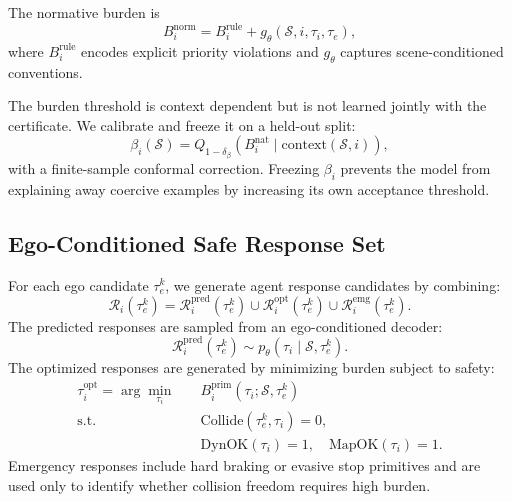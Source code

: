 \documentclass[10pt]{article}
\begin{document}
The normative burden is
\begin{equation}
    B^{\mathrm{norm}}_i
    =
    B^{\mathrm{rule}}_i
    +
    g_\theta(\mathcal{S},i,\tau_i,\tau_e),
\end{equation}
where $B^{\mathrm{rule}}_i$ encodes explicit priority violations and $g_\theta$ captures scene-conditioned conventions.

The burden threshold is context dependent but is not learned jointly with the certificate. We calibrate and freeze it on a held-out split:
\begin{equation}
    \beta_i(\mathcal{S})
    =Q_{1-\delta_\beta}
    \left(B_i^{\mathrm{nat}}\mid \mathrm{context}(\mathcal{S},i)\right),
\end{equation}
with a finite-sample conformal correction. Freezing $\beta_i$ prevents the model from explaining away coercive examples by increasing its own acceptance threshold.

\subsection{Ego-Conditioned Safe Response Set}
\label{app:safe_response}

For each ego candidate $\tau^k_e$, we generate agent response candidates by combining:
\begin{equation}
    \mathcal{R}_i(\tau^k_e)
    =
    \mathcal{R}^{\mathrm{pred}}_i(\tau^k_e)
    \cup
    \mathcal{R}^{\mathrm{opt}}_i(\tau^k_e)
    \cup
    \mathcal{R}^{\mathrm{emg}}_i(\tau^k_e).
\end{equation}
The predicted responses are sampled from an ego-conditioned decoder:
\begin{equation}
    \mathcal{R}^{\mathrm{pred}}_i(\tau^k_e)
    \sim
    p_\theta(\tau_i \mid \mathcal{S},\tau^k_e).
\end{equation}
The optimized responses are generated by minimizing burden subject to safety:
\begin{equation}
\begin{aligned}
    \tau_i^{\mathrm{opt}}
    =
    \arg\min_{\tau_i}\quad
    &
    B_i^{\mathrm{prim}}(\tau_i;\mathcal{S},\tau^k_e) \\
    \mathrm{s.t.}\quad
    &
    \mathrm{Collide}(\tau^k_e,\tau_i)=0,\\
    &
    \mathrm{DynOK}(\tau_i)=1,\quad
    \mathrm{MapOK}(\tau_i)=1 .
\end{aligned}
\end{equation}
Emergency responses include hard braking or evasive stop primitives and are used only to identify whether collision freedom requires high burden.
\end{document}
